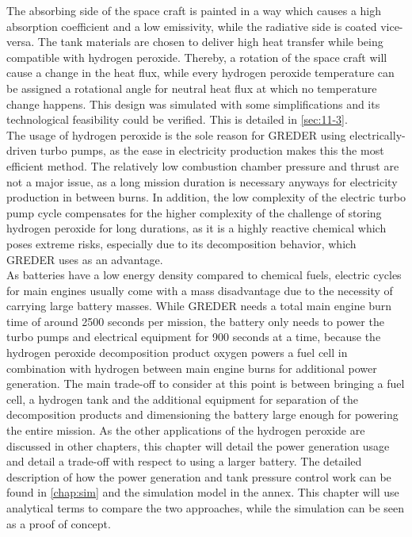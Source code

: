 The absorbing side of the space craft is painted in a way which causes a high absorption coefficient and a low emissivity, while the radiative side is coated vice-versa. The tank materials are chosen to deliver high heat transfer while being compatible with hydrogen peroxide. Thereby, a rotation of the space craft will cause a change in the heat flux, while every hydrogen peroxide temperature can be assigned a rotational angle for neutral heat flux at which no temperature change happens. This design was simulated with some simplifications and its technological feasibility could be verified. This is detailed in \autoref{sec:11-3}. \\

The usage of hydrogen peroxide is the sole reason for GREDER using electrically-driven turbo pumps, as the ease in electricity production makes this the most efficient method. The relatively low combustion chamber pressure and thrust are not a major issue, as a long mission duration is necessary anyways for electricity production in between burns. In addition, the low complexity of the electric turbo pump cycle compensates for the higher complexity of the challenge of storing hydrogen peroxide for long durations, as it is a highly reactive chemical which poses extreme risks, especially due to its decomposition behavior, which GREDER uses as an advantage. \\

As batteries have a low energy density compared to chemical fuels, electric cycles for main engines usually come with a mass disadvantage due to the necessity of carrying large battery masses. While GREDER needs a total main engine burn time of around 2500 seconds per mission, the battery only needs to power the turbo pumps and electrical equipment for 900 seconds at a time, because the hydrogen peroxide decomposition product oxygen powers a fuel cell in combination with hydrogen between main engine burns for additional power generation. The main trade-off to consider at this point is between bringing a fuel cell, a hydrogen tank and the additional equipment for separation of the decomposition products and dimensioning the battery large enough for powering the entire mission. As the other applications of the hydrogen peroxide are discussed in other chapters, this chapter will detail the power generation usage and detail a trade-off with respect to using a larger battery. The detailed description of how the power generation and tank pressure control work can be found in \autoref{chap:sim} and the simulation model in the annex. This chapter will use analytical terms to compare the two approaches, while the simulation can be seen as a proof of concept.\\

